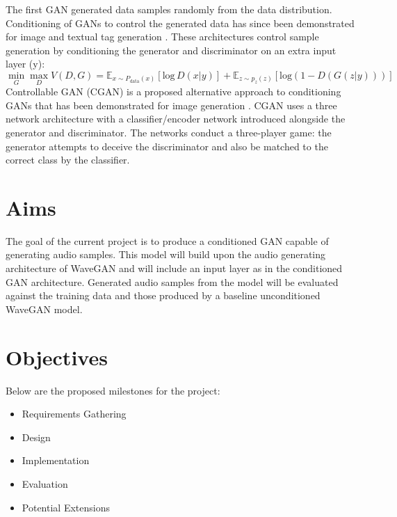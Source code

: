\documentclass[a4paper, dvipsnames, titlepage]{article}
\begin{document}
The first GAN generated data samples randomly from the data distribution.
Conditioning of GANs to control the generated data has since been demonstrated for image and textual tag generation \citep{2014arXiv1411.1784M}.
These architectures control sample generation by conditioning the generator and discriminator on an extra input layer (y):
\newline
%
\begin{equation}
  \min_{G} \max_{D} V(D,G) = \mathbb{E}_{x \sim P_\mathrm{data}(x)}[\mathrm{log}\,D(x|y)] + \mathbb{E}_{z \sim p_z(z)}[\mathrm{log} (1 - D(G(z|y)))]
\end{equation}
%
\newline
Controllable GAN (CGAN) is a proposed alternative approach to conditioning GANs that has been demonstrated for image generation \citep{2017arXiv170800598L}.
CGAN uses a three network architecture with a classifier/encoder network introduced alongside the generator and discriminator.
The networks conduct a three-player game: the generator attempts to deceive the discriminator and also be matched to the correct class by the classifier.

\newpage

\section{Aims}

The goal of the current project is to produce a conditioned GAN capable of generating audio samples.
This model will build upon the audio generating architecture of WaveGAN and will include an input layer as in the conditioned GAN architecture.
Generated audio samples from the model will be evaluated against the training data and those produced by a baseline unconditioned WaveGAN model.

\newpage

\section{Objectives}

Below are the proposed milestones for the project:

\begin{itemize}
\item Requirements Gathering
\item Design
\item Implementation
\item Evaluation
\item Potential Extensions
\end{itemize}
\end{document}

